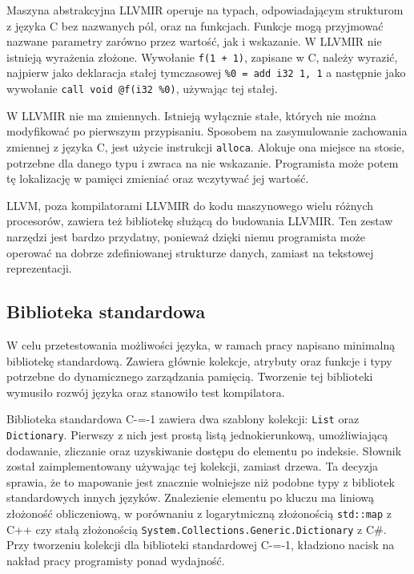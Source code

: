 Maszyna abstrakcyjna LLVMIR operuje na typach, odpowiadającym strukturom z języka C bez nazwanych pól, oraz na funkcjach.
Funkcje mogą przyjmować nazwane parametry zarówno przez wartość, jak i wskazanie.
W LLVMIR nie istnieją wyrażenia złożone.
Wywołanie \lstinline{f(1 + 1)}, zapisane w C, należy wyrazić, najpierw jako deklaracja stałej tymczasowej \lstinline{%0 = add i32 1, 1} a następnie jako wywołanie \lstinline{call void @f(i32 %0)}, używając tej stałej.

W LLVMIR nie ma zmiennych.
Istnieją wyłącznie stałe, których nie można modyfikować po pierwszym przypisaniu.
Sposobem na zasymulowanie zachowania zmiennej z języka C, jest użycie instrukcji \lstinline{alloca}.
Alokuje ona miejsce na stosie, potrzebne dla danego typu i zwraca na nie wskazanie.
Programista może potem tę lokalizację w pamięci zmieniać oraz wczytywać jej wartość.

LLVM, poza kompilatorami LLVMIR do kodu maszynowego wielu różnych procesorów, zawiera też bibliotekę służącą do budowania LLVMIR.
Ten zestaw narzędzi jest bardzo przydatny, ponieważ dzięki niemu programista może operować na dobrze zdefiniowanej strukturze danych, zamiast na tekstowej reprezentacji.

\subsection{Biblioteka standardowa}

W celu przetestowania możliwości języka, w ramach pracy napisano minimalną bibliotekę standardową.
Zawiera głównie kolekcje, atrybuty oraz funkcje i typy potrzebne do dynamicznego zarządzania pamięcią.
Tworzenie tej biblioteki wymusiło rozwój języka oraz stanowiło test kompilatora.

Biblioteka standardowa C-=-1 zawiera dwa szablony kolekcji: \lstinline{List} oraz \lstinline{Dictionary}.
Pierwszy z nich jest prostą listą jednokierunkową, umożliwiającą dodawanie, zliczanie oraz uzyskiwanie dostępu do elementu po indeksie.
Słownik został zaimplementowany używając tej kolekcji, zamiast drzewa.
Ta decyzja sprawia, że to mapowanie jest znacznie wolniejsze niż podobne typy z bibliotek standardowych innych języków.
Znalezienie elementu po kluczu ma liniową złożoność obliczeniową, w porównaniu z logarytmiczną złożonością \lstinline{std::map} z C++ czy stałą złożonością \lstinline{System.Collections.Generic.Dictionary} z C\#.
Przy tworzeniu kolekcji dla biblioteki standardowej C-=-1, kładziono nacisk na nakład pracy programisty ponad wydajność.

